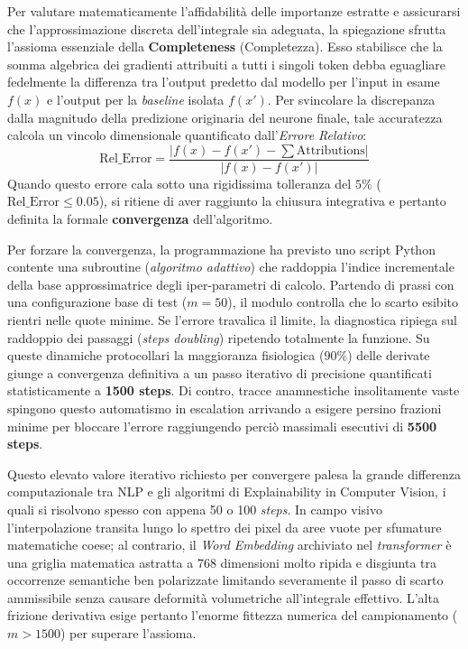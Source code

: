 Per valutare matematicamente l'affidabilità delle importanze estratte e assicurarsi che l'approssimazione discreta dell'integrale sia adeguata, la spiegazione sfrutta l'assioma essenziale della \textbf{Completeness} (Completezza). Esso stabilisce che la somma algebrica dei gradienti attribuiti a tutti i singoli token debba eguagliare fedelmente la differenza tra l'output predetto dal modello per l'input in esame $f(x)$ e l'output per la \textit{baseline} isolata $f(x')$. Per svincolare la discrepanza dalla magnitudo della predizione originaria del neurone finale, tale accuratezza calcola un vincolo dimensionale quantificato dall'\textit{Errore Relativo}:
\begin{equation}
\text{Rel\_Error} = \frac{| f(x) - f(x') - \sum \text{Attributions} |}{| f(x) - f(x') |}
\end{equation}
Quando questo errore cala sotto una rigidissima tolleranza del $5\%$ ($\text{Rel\_Error} \le 0.05$), si ritiene di aver raggiunto la chiusura integrativa e pertanto definita la formale \textbf{convergenza} dell'algoritmo.

Per forzare la convergenza, la programmazione ha previsto uno script Python contente una subroutine (\textit{algoritmo adattivo}) che raddoppia l'indice incrementale della base approssimatrice degli iper-parametri di calcolo. Partendo di prassi con una configurazione base di test ($m=50$), il modulo controlla che lo scarto esibito rientri nelle quote minime. Se l'errore travalica il limite, la diagnostica ripiega sul raddoppio dei passaggi (\textit{steps doubling}) ripetendo totalmente la funzione.
Su queste dinamiche protocollari la maggioranza fisiologica ($90\%$) delle derivate giunge a convergenza definitiva a un passo iterativo di precisione quantificati statisticamente a \textbf{1500 steps}. Di contro, tracce anamnestiche insolitamente vaste spingono questo automatismo in escalation arrivando a esigere persino frazioni minime per bloccare l'errore raggiungendo perciò massimali esecutivi di \textbf{5500 steps}.

Questo elevato valore iterativo richiesto per convergere palesa la grande differenza computazionale tra NLP e gli algoritmi di Explainability in Computer Vision, i quali si risolvono spesso con appena 50 o 100 \textit{steps}. In campo visivo l'interpolazione transita lungo lo spettro dei pixel da aree vuote per sfumature matematiche coese; al contrario, il \textit{Word Embedding} archiviato nel \textit{transformer} è una griglia matematica astratta a 768 dimensioni molto ripida e disgiunta tra occorrenze semantiche ben polarizzate limitando severamente il passo di scarto ammissibile senza causare deformità volumetriche all'integrale effettivo. L'alta frizione derivativa esige pertanto l'enorme fittezza numerica del campionamento ($m>1500$) per superare l'assioma.

